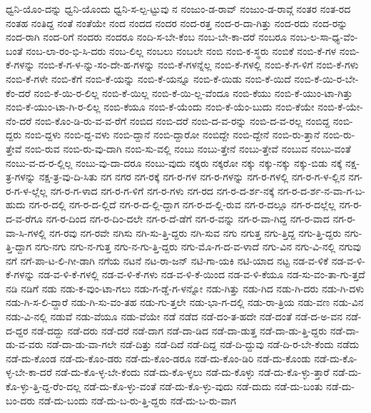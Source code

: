 {ಧ್ವನಿ-ಯೊಂ-ದನ್ನು
ಧ್ವನಿ-ಯೊಂದು
ಧ್ವನಿ-ಸ-ಲ್ಪ-ಟ್ಟುವು
ನ
ನಂಜುಂ-ಡ-ರಾವ್
ನಂಜುಂ-ಡ-ರಾವ್ಗೆ
ನಂತರ
ನಂತ-ರದ
ನಂತಹ
ನಂತಿದ್ದ
ನಂತೆ
ನಂತೆಯೇ
ನಂದ
ನಂದದ
ನಂದರ
ನಂದ-ರತ್ತ
ನಂದ-ರ-ದಾ-ಗಿತ್ತು
ನಂದ-ರದು
ನಂದ-ರನ್ನು
ನಂದ-ರಾಗಿ
ನಂದ-ರಿಗೆ
ನಂದರು
ನಂದರೂ
ನಂದಿ-ಸ-ಬೇ-ಕೆಂಬ
ನಂಬ-ಬೇ-ಕಾ-ದರೆ
ನಂಬರೂ
ನಂಬ-ಲ-ಸಾ-ಧ್ಯ-ವೆಂ-ಬಂತೆ
ನಂಬ-ಲಾ-ರಂ-ಭಿ-ಸಿ-ದರು
ನಂಬ-ಲಿಲ್ಲ
ನಂಬಲು
ನಂಬಲೇ
ನಂಬಿ
ನಂಬಿ-ಕ-ಸ್ಥರು
ನಂಬಿಕೆ
ನಂಬಿ-ಕೆ-ಗಳ
ನಂಬಿ-ಕೆ-ಗಳನ್ನು
ನಂಬಿ-ಕೆ-ಗ-ಳ-ನ್ನು-ಸಂ-ದೇ-ಹ-ಗಳನ್ನು
ನಂಬಿ-ಕೆ-ಗಳನ್ನೆಲ್ಲ
ನಂಬಿ-ಕೆ-ಗಳಲ್ಲಿ
ನಂಬಿ-ಕೆ-ಗ-ಳಿಗೆ
ನಂಬಿ-ಕೆ-ಗಳು
ನಂಬಿ-ಕೆ-ಗಳೇ
ನಂಬಿ-ಕೆಗೆ
ನಂಬಿ-ಕೆ-ಯನ್ನು
ನಂಬಿ-ಕೆ-ಯನ್ನೂ
ನಂಬಿ-ಕೆ-ಯಿಡು
ನಂಬಿ-ಕೆ-ಯಿದೆ
ನಂಬಿ-ಕೆ-ಯಿ-ರ-ಬೇ-ಕೆಂ-ದರೆ
ನಂಬಿ-ಕೆ-ಯಿ-ರ-ಲಿಲ್ಲ
ನಂಬಿ-ಕೆ-ಯಿಲ್ಲ
ನಂಬಿ-ಕೆ-ಯಿ-ಲ್ಲ-ವೆಂದೂ
ನಂಬಿ-ಕೆಯು
ನಂಬಿ-ಕೆ-ಯುಂ-ಟಾ-ಗಿತ್ತು
ನಂಬಿ-ಕೆ-ಯುಂ-ಟಾ-ಗಿ-ರ-ಲಿಲ್ಲ
ನಂಬಿ-ಕೆಯೂ
ನಂಬಿ-ಕೆ-ಯೆಂದು
ನಂಬಿ-ಕೆ-ಯೆಂ-ಬುದು
ನಂಬಿ-ಕೆಯೇ
ನಂಬಿ-ಕೆ-ಯೇ-ನೆಂ-ದರೆ
ನಂಬಿ-ಕೊಂ-ಡಿ-ರು-ವ-ವ-ರೆಗೆ
ನಂಬಿದ
ನಂಬಿ-ದರೆ
ನಂಬಿ-ದ-ವ-ರನ್ನು
ನಂಬಿ-ದ-ವ-ರಲ್ಲ
ನಂಬಿದ್ದ
ನಂಬಿ-ದ್ದರು
ನಂಬಿ-ದ್ದಳು
ನಂಬಿ-ದ್ದ-ವಳು
ನಂಬಿ-ದ್ದಾನೆ
ನಂಬಿ-ದ್ದಾರೋ
ನಂಬಿದ್ದೇ
ನಂಬಿ-ದ್ದೇನೆ
ನಂಬಿ-ರು-ತ್ತಾನೆ
ನಂಬಿ-ರು-ತ್ತೇವೆ
ನಂಬಿ-ರುವ
ನಂಬಿ-ರು-ವು-ದಾಗಿ
ನಂಬಿ-ಸು-ವಲ್ಲಿ
ನಂಬು
ನಂಬು-ತ್ತೇನೆ
ನಂಬು-ತ್ತೇವೆ
ನಂಬುವ
ನಂಬು-ವಂತೆ
ನಂಬು-ವ-ದ-ರ-ಲ್ಲಿಲ್ಲ
ನಂಬು-ವು-ದಾ-ದರೂ
ನಂಬು-ವುದು
ನಕ್ಕರು
ನಕ್ಕರೋ
ನಕ್ಕು
ನಕ್ಕು-ನಕ್ಕು
ನಕ್ಕು-ಬಿಡು
ನಕ್ಕೆ
ನಕ್ಷ-ತ್ರ-ಗಳನ್ನು
ನಕ್ಷ-ತ್ರ-ವು-ದಿ-ಸಿತು
ನಗ
ನಗರ
ನಗ-ರಕ್ಕೆ
ನಗ-ರ-ಗಳ
ನಗ-ರ-ಗಳನ್ನು
ನಗ-ರ-ಗಳಲ್ಲಿ
ನಗ-ರ-ಗ-ಳ-ಲ್ಲಿನ
ನಗ-ರ-ಗ-ಳ-ಲ್ಲೆಲ್ಲ
ನಗ-ರ-ಗ-ಳಾದ
ನಗ-ರ-ಗ-ಳಿಗೆ
ನಗ-ರ-ಗಳು
ನಗ-ರದ
ನಗ-ರ-ದ-ರ್ಶ-ನಕ್ಕೆ
ನಗ-ರ-ದ-ರ್ಶ-ನ-ವಾ-ಗ-ಬ-ಹುದು
ನಗ-ರ-ದಲ್ಲಿ
ನಗ-ರ-ದ-ಲ್ಲಿದೆ
ನಗ-ರ-ದ-ಲ್ಲಿ-ದ್ದಾಗ
ನಗ-ರ-ದ-ಲ್ಲಿ-ರುವ
ನಗ-ರ-ದಲ್ಲೂ
ನಗ-ರ-ದಲ್ಲೆಲ್ಲ
ನಗ-ರ-ದ-ವ-ರೆಗೂ
ನಗ-ರ-ದಿಂದ
ನಗ-ರ-ದಿಂ-ದಲೇ
ನಗ-ರ-ದೆ-ಡೆಗೆ
ನಗ-ರ-ವನ್ನು
ನಗ-ರ-ವಾ-ಗಿದ್ದ
ನಗ-ರ-ವಾದ
ನಗ-ರ-ವಾ-ಸಿ-ಗಳಲ್ಲಿ
ನಗ-ರವು
ನಗ-ರವೇ
ನಗಿಸು
ನಗಿ-ಸು-ತ್ತಿ-ದ್ದರು
ನಗಿ-ಸುವ
ನಗು
ನಗುತ್ತ
ನಗು-ತ್ತಿದ್ದ
ನಗು-ತ್ತಿ-ದ್ದರು
ನಗು-ತ್ತಿ-ದ್ದಾಗ
ನಗು-ನಗು
ನಗು-ನ-ಗುತ್ತ
ನಗು-ನ-ಗು-ತ್ತಿ-ದ್ದರು
ನಗು-ಮೊ-ಗ-ದ-ವ-ಳಾದೆ
ನಗು-ವಿನ
ನಗು-ವಿ-ನಲ್ಲಿ
ನಗುವು
ನಗೆ
ನಗೆ-ಪಾ-ಟ-ಲಿ-ಗೀ-ಡಾಗಿ
ನಗೆಯ
ನಟನೆ
ನಟ-ರಾ-ಜನ್
ನಟಿ-ಗಾ-ಯಕಿ
ನಟಿ-ಯಾದ
ನಟ್ಟ
ನಡ-ವ-ಳಿಕೆ
ನಡ-ವ-ಳಿ-ಕೆ-ಗಳನ್ನು
ನಡ-ವ-ಳಿ-ಕೆ-ಗಳಲ್ಲಿ
ನಡ-ವ-ಳಿ-ಕೆ-ಗಳು
ನಡ-ವ-ಳಿ-ಕೆ-ಯಿಂದ
ನಡ-ವ-ಳಿ-ಕೆಯೂ
ನಡ-ಸು-ವಂ-ತಾ-ಗು-ತ್ತದೆ
ನಡಿ
ನಡಿಗೆ
ನಡು
ನಡು-ಕ-ವುಂ-ಟಾ-ಗಲು
ನಡು-ಗ-ಡ್ಡೆ-ಗ-ಳನ್ನೋ
ನಡು-ಗಿತ್ತು
ನಡು-ಗಿದ
ನಡು-ಗಿ-ದರು
ನಡು-ಗಿ-ದಳು
ನಡು-ಗಿ-ಸ-ಲಿ-ದ್ದಾರೆ
ನಡು-ಗಿ-ಸು-ವಂ-ತಹ
ನಡು-ಗು-ತ್ತಲೇ
ನಡು-ಭಾ-ಗ-ದಲ್ಲಿ
ನಡು-ರಾ-ತ್ರಿಯ
ನಡು-ವಣ
ನಡು-ವಿನ
ನಡು-ವಿ-ನಲ್ಲಿ
ನಡುವೆ
ನಡು-ವೆಯೂ
ನಡು-ವೆಯೇ
ನಡೆ
ನಡೆದ
ನಡೆ-ದಂ-ತ-ಹದೇ
ನಡೆ-ದಂತೆ
ನಡೆ-ದ-ಅ-ವನ
ನಡೆ-ದ-ದ್ದರ
ನಡೆ-ದದ್ದು
ನಡೆ-ದರು
ನಡೆ-ದರೆ
ನಡೆ-ದಾಗ
ನಡೆ-ದಾ-ಡಿದ
ನಡೆ-ದಾ-ಡುತ್ತ
ನಡೆ-ದಾ-ಡು-ತ್ತಿ-ದ್ದರು
ನಡೆ-ದಾ-ಡು-ವ-ವರು
ನಡೆ-ದಾ-ಡು-ವಾ-ಗಲೇ
ನಡೆ-ದಿತ್ತು
ನಡೆ-ದಿದೆ
ನಡೆ-ದಿದ್ದ
ನಡೆ-ದಿ-ದ್ದುವು
ನಡೆ-ದಿ-ರ-ಬೇ-ಕೆಂದು
ನಡೆದು
ನಡೆ-ದು-ಕೊಂಡ
ನಡೆ-ದು-ಕೊಂ-ಡರು
ನಡೆ-ದು-ಕೊಂ-ಡರೂ
ನಡೆ-ದು-ಕೊಂ-ಡಿರಿ
ನಡೆ-ದು-ಕೊಂಡು
ನಡೆ-ದು-ಕೊ-ಳ್ಳ-ಬೇ-ಕಾ-ದರೆ
ನಡೆ-ದು-ಕೊ-ಳ್ಳ-ಬೇ-ಕೆಂದು
ನಡೆ-ದು-ಕೊ-ಳ್ಳಲು
ನಡೆ-ದು-ಕೊಳ್ಳು
ನಡೆ-ದು-ಕೊ-ಳ್ಳು-ತ್ತಾರೆ
ನಡೆ-ದು-ಕೊ-ಳ್ಳು-ತ್ತಿ-ದ್ದ-ರೆಂ-ದಲ್ಲ
ನಡೆ-ದು-ಕೊ-ಳ್ಳು-ವಂತೆ
ನಡೆ-ದು-ಕೊ-ಳ್ಳು-ವುದು
ನಡೆ-ದುದು
ನಡೆ-ದು-ಬಂತು
ನಡೆ-ದು-ಬಂ-ದರು
ನಡೆ-ದು-ಬಂದು
ನಡೆ-ದು-ಬ-ರು-ತ್ತಿ-ದ್ದರು
ನಡೆ-ದು-ಬ-ರು-ವಾಗ
}
